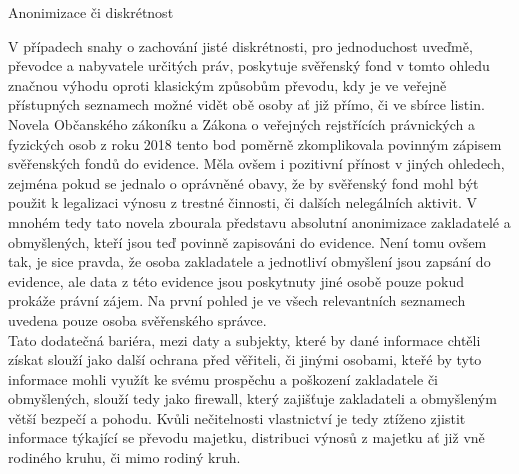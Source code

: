 \documentclass{article}
\begin{document}
 
  \begin{enumerate}
 {\Large\item[3.] Anonimizace či diskrétnost}
 \end{enumerate}
 
 V případech snahy o zachování jisté diskrétnosti, pro jednoduchost uveďmě, převodce a nabyvatele určitých práv, poskytuje svěřenský fond v tomto ohledu značnou výhodu oproti klasickým způsobům převodu, kdy je ve veřejně přístupných seznamech možné vidět obě osoby ať již přímo, či ve sbírce listin. Novela Občanského zákoníku a Zákona o veřejných rejstřících právnických a fyzických osob z roku 2018 tento bod poměrně zkomplikovala povinným zápisem svěřenských fondů do evidence. Měla ovšem i pozitivní přínost v jiných ohledech, zejména pokud se jednalo o oprávněné obavy, že by svěřenský fond mohl být použit k legalizaci výnosu z trestné činnosti, či dalších nelegálních aktivit. V mnohém tedy tato novela zbourala představu absolutní anonimizace zakladatelé a obmyšlených, kteří jsou teď povinně zapisováni do evidence. Není tomu ovšem tak, je sice pravda, že osoba zakladatele a jednotliví obmyšlení jsou zapsání do evidence, ale data z této evidence jsou poskytnuty jiné osobě pouze pokud prokáže právní zájem. Na první pohled je ve všech relevantních seznamech uvedena pouze osoba svěřenského správce.\\
 
 Tato dodatečná bariéra, mezi daty a subjekty, které by dané informace chtěli získat slouží jako další ochrana před věřiteli, či jinými osobami, kteřé by tyto informace mohli využít ke svému prospěchu a poškození zakladatele či obmyšlených, slouží tedy jako firewall, který zajišťuje zakladateli a obmyšleným větší bezpečí a pohodu. Kvůli nečitelnosti vlastnictví je tedy ztíženo zjistit informace týkající se převodu majetku, distribuci výnosů z majetku ať již vně rodiného kruhu, či mimo rodiný kruh.\\
 
 
\end{document}

